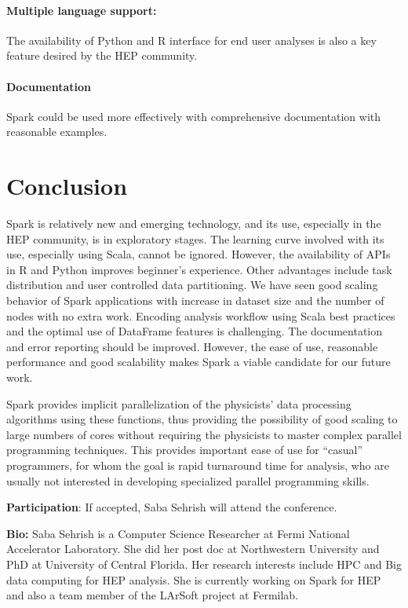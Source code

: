\documentclass[11pt, twocolumn]{article}
\begin{document}
\paragraph{Multiple language support: }
The availability of Python and R interface for end user analyses is also a key feature desired by the HEP community.


\paragraph{Documentation} 
Spark could be used more effectively with comprehensive documentation with 
reasonable examples. 


\section{Conclusion}
Spark is relatively new and emerging technology, and its use, especially 
in the HEP community, is in exploratory stages. The learning curve involved 
with its use, especially using Scala, cannot be ignored. However, the availability 
of APIs in R and Python improves beginner's experience. 
Other advantages include task distribution and user controlled 
data partitioning. We have seen good scaling behavior of Spark applications 
with increase in dataset size and the number of nodes with no extra work. 
Encoding analysis workflow using Scala best practices and the optimal 
use of DataFrame features is challenging. The documentation 
and error reporting should be improved. However, the ease of use, 
reasonable performance and good scalability makes Spark a viable candidate for our future work.

Spark provides implicit parallelization of the
physicists' data processing algorithms using these functions, thus providing the possibility
of good scaling to large numbers of cores without requiring the
physicists to master complex parallel programming techniques. This
provides important ease of use for ``casual'' programmers, for whom
the goal is rapid turnaround time for analysis, who are usually not
interested in developing specialized parallel programming
skills. 

\textbf{Participation}: If accepted, Saba Sehrish will attend the conference. 

\textbf{Bio:} 
Saba Sehrish is a Computer Science Researcher 
at Fermi National Accelerator Laboratory. She did her post doc at Northwestern University
and PhD at University of Central Florida. 
Her research interests include HPC and Big data computing for HEP analysis.  
She is currently working on Spark for HEP and also a team member of the LArSoft 
project at Fermilab. 
\end{document}
